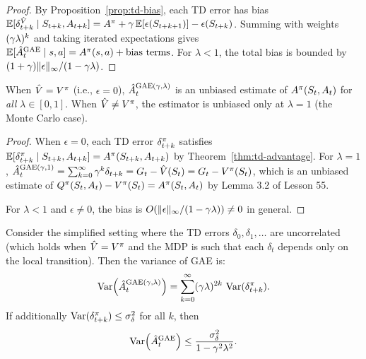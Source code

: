 \documentclass[11pt,a4paper]{article}
\begin{document}
\begin{proof}
By Proposition~\ref{prop:td-bias}, each TD error has bias
$\mathbb{E}[\delta_{t+k}^{\hat{V}} \mid S_{t+k}, A_{t+k}] = A^\pi +
\gamma\, \mathbb{E}[\epsilon(S_{t+k+1})] - \epsilon(S_{t+k})$. Summing with
weights $(\gamma\lambda)^k$ and taking iterated expectations gives
$\mathbb{E}[\hat{A}_t^{\mathrm{GAE}} \mid s, a] = A^\pi(s,a) +
\text{bias terms}$. For $\lambda < 1$, the total bias is bounded by
$(1+\gamma)\|\epsilon\|_\infty / (1-\gamma\lambda)$.
\end{proof}

\begin{corollary}[Unbiasedness at $\lambda = 1$]
\label{cor:gae-unbiased}
When $\hat{V} = V^{\pi}$ (i.e., $\epsilon = 0$),
$\hat{A}_t^{\mathrm{GAE}(\gamma,\lambda)}$ is an unbiased estimate
of $A^\pi(S_t, A_t)$ for \emph{all} $\lambda \in [0,1]$. When
$\hat{V} \neq V^{\pi}$, the estimator is unbiased only at $\lambda = 1$
(the Monte Carlo case).
\end{corollary}

\begin{proof}
When $\epsilon = 0$, each TD error $\delta_{t+k}^\pi$ satisfies
$\mathbb{E}[\delta_{t+k}^\pi \mid S_{t+k}, A_{t+k}] = A^\pi(S_{t+k},
A_{t+k})$ by Theorem~\ref{thm:td-advantage}. For $\lambda = 1$,
$\hat{A}_t^{\mathrm{GAE}(\gamma,1)} = \sum_{k=0}^\infty \gamma^k
\delta_{t+k} = G_t - \hat{V}(S_t) = G_t - V^{\pi}(S_t)$, which is an
unbiased estimate of $Q^{\pi}(S_t, A_t) - V^{\pi}(S_t) = A^\pi(S_t, A_t)$
by Lemma 3.2 of Lesson 55.

For $\lambda < 1$ and $\epsilon \neq 0$, the bias is
$O(\|\epsilon\|_\infty / (1 - \gamma\lambda)) \neq 0$ in general.
\end{proof}

\begin{theorem}
\label{thm:gae-variance}
Consider the simplified setting where the TD errors
$\delta_0, \delta_1, \ldots$ are uncorrelated (which holds when $\hat{V}
= V^{\pi}$ and the MDP is such that each $\delta_t$ depends only on the
local transition). Then the variance of GAE is:
\[
  \operatorname{Var}\!\left(\hat{A}_t^{\mathrm{GAE}(\gamma,\lambda)}\right)
  = \sum_{k=0}^{\infty} (\gamma\lambda)^{2k}\,
  \operatorname{Var}(\delta_{t+k}^\pi).
\]
If additionally $\operatorname{Var}(\delta_{t+k}^\pi) \leq \sigma_\delta^2$ for
all $k$, then
\[
  \operatorname{Var}\!\left(\hat{A}_t^{\mathrm{GAE}}\right)
  \leq \frac{\sigma_\delta^2}{1 - \gamma^2 \lambda^2}.
\]
\end{theorem}
\end{document}
